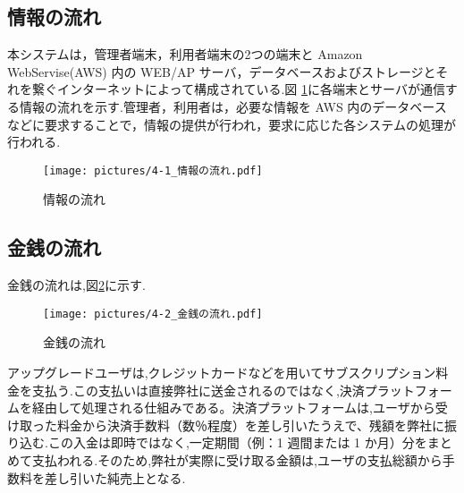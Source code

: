 \subsection{情報の流れ}
本システムは，管理者端末，利用者端末の2つの端末と Amazon WebServise(AWS) 内の WEB/AP サーバ，データベースおよびストレージとそれを繋ぐインターネットによって構成されている.図 \ref{fig:Q7}に各端末とサーバが通信する情報の流れを示す.管理者，利用者は，必要な情報を AWS 内のデータベースなどに要求することで，情報の提供が行われ，要求に応じた各システムの処理が行われる.

\begin{figure}[H]
        \centering
        \texttt{[image: pictures/4-1\_情報の流れ.pdf]}
        \caption{情報の流れ}
        \label{fig:Q7}
\end{figure}



\subsection{金銭の流れ}
金銭の流れは,図\ref{fig:Q8}に示す.

\begin{figure}[H]
        \centering
        \texttt{[image: pictures/4-2\_金銭の流れ.pdf]}
        \caption{金銭の流れ}
        \label{fig:Q8}
\end{figure}

アップグレードユーザは,クレジットカードなどを用いてサブスクリプション料金を支払う.この支払いは直接弊社に送金されるのではなく,決済プラットフォームを経由して処理される仕組みである。決済プラットフォームは,ユーザから受け取った料金から決済手数料（数％程度）を差し引いたうえで、残額を弊社に振り込む.この入金は即時ではなく,一定期間（例：1 週間または 1 か月）分をまとめて支払われる.そのため,弊社が実際に受け取る金額は,ユーザの支払総額から手数料を差し引いた純売上となる.







